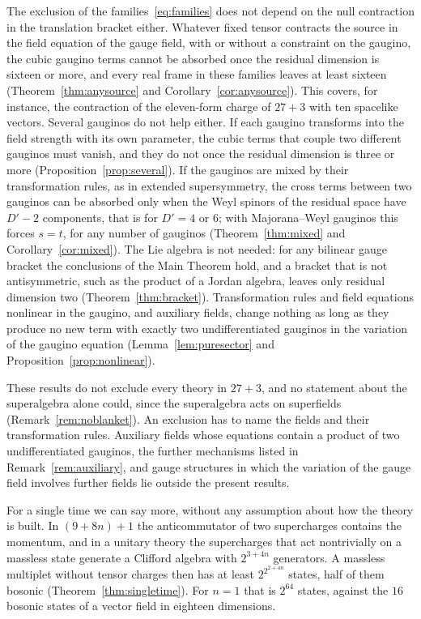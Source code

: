 The exclusion of the families~\eqref{eq:families} does not depend on the null contraction in the translation bracket either. Whatever fixed tensor contracts the source in the field equation of the gauge field, with or without a constraint on the gaugino, the cubic gaugino terms cannot be absorbed once the residual dimension is sixteen or more, and every real frame in these families leaves at least sixteen (Theorem~\ref{thm:anysource} and Corollary~\ref{cor:anysource}). This covers, for instance, the contraction of the eleven-form charge of $27+3$ with ten spacelike vectors. Several gauginos do not help either. If each gaugino transforms into the field strength with its own parameter, the cubic terms that couple two different gauginos must vanish, and they do not once the residual dimension is three or more (Proposition~\ref{prop:several}). If the gauginos are mixed by their transformation rules, as in extended supersymmetry, the cross terms between two gauginos can be absorbed only when the Weyl spinors of the residual space have $D'-2$ components, that is for $D'=4$ or $6$; with Majorana--Weyl gauginos this forces $s=t$, for any number of gauginos (Theorem~\ref{thm:mixed} and Corollary~\ref{cor:mixed}). The Lie algebra is not needed: for any bilinear gauge bracket the conclusions of the Main Theorem hold, and a bracket that is not antisymmetric, such as the product of a Jordan algebra, leaves only residual dimension two (Theorem~\ref{thm:bracket}). Transformation rules and field equations nonlinear in the gaugino, and auxiliary fields, change nothing as long as they produce no new term with exactly two undifferentiated gauginos in the variation of the gaugino equation (Lemma~\ref{lem:puresector} and Proposition~\ref{prop:nonlinear}).

These results do not exclude every theory in $27+3$, and no statement about the superalgebra alone could, since the superalgebra acts on superfields (Remark~\ref{rem:noblanket}). An exclusion has to name the fields and their transformation rules. Auxiliary fields whose equations contain a product of two undifferentiated gauginos, the further mechanisms listed in Remark~\ref{rem:auxiliary}, and gauge structures in which the variation of the gauge field involves further fields lie outside the present results.

For a single time we can say more, without any assumption about how the theory is built. In $(9+8n)+1$ the anticommutator of two supercharges contains the momentum, and in a unitary theory the supercharges that act nontrivially on a massless state generate a Clifford algebra with $2^{3+4n}$ generators. A massless multiplet without tensor charges then has at least $2^{2^{2+4n}}$ states, half of them bosonic (Theorem~\ref{thm:singletime}). For $n=1$ that is $2^{64}$ states, against the $16$ bosonic states of a vector field in eighteen dimensions.

